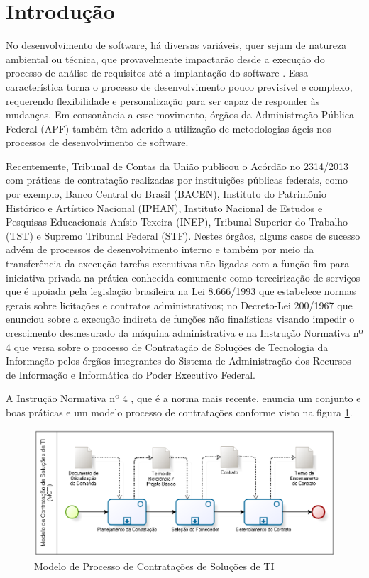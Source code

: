 \section{Introdução}
\label{intro}

No desenvolvimento de software, há diversas variáveis, quer sejam de natureza ambiental ou técnica, que provavelmente impactarão desde a execução do processo de análise de requisitos até a implantação do software \cite{beckarticle1999}. Essa característica torna o processo de desenvolvimento pouco previsível e complexo, requerendo flexibilidade e personalização para ser capaz de responder às mudanças. 
Em consonância a esse movimento, órgãos da Administração Pública Federal (APF) também têm aderido a utilização de metodologias ágeis nos processos de desenvolvimento de software.

Recentemente, Tribunal de Contas da União publicou o Acórdão no 2314/2013 \cite{TCU:2013}
com práticas de contratação realizadas por instituições públicas federais, como por exemplo, Banco Central do Brasil (BACEN), Instituto do Patrimônio Histórico e Artístico Nacional (IPHAN), Instituto Nacional de Estudos e Pesquisas Educacionais Anísio Texeira (INEP), Tribunal Superior do Trabalho (TST) e Supremo Tribunal Federal (STF). Nestes órgãos, alguns casos de sucesso advém de processos de desenvolvimento interno e também por meio da transferência da execução tarefas executivas não ligadas com a função fim para iniciativa privada na prática conhecida comumente como terceirização de serviços que é apoiada pela legislação brasileira na Lei 8.666/1993 \cite{Lei8666:1993} que estabelece normas gerais sobre licitações e contratos administrativos; no Decreto-Lei 200/1967 que enunciou sobre a execução indireta de funções não finalísticas visando impedir o crescimento desmesurado da máquina administrativa e na Instrução Normativa nº 4 \cite{IN04:2010} que versa sobre o processo de Contratação de Soluções de Tecnologia da Informação pelos órgãos integrantes do Sistema de Administração dos Recursos de Informação e Informática do Poder Executivo Federal.

A Instrução Normativa nº 4 \cite{IN04:2010}, que é a norma mais recente, enuncia um conjunto e boas práticas e um modelo processo de contratações conforme visto na figura \ref{processo}. 

\begin{figure}[h]
        \centering
        \label{processo}
            \includegraphics[scale=0.7]{figuras/MCTI.eps}
        \caption{Modelo de Processo de Contratações de Soluções de TI \cite{mcti}}
\end{figure}

